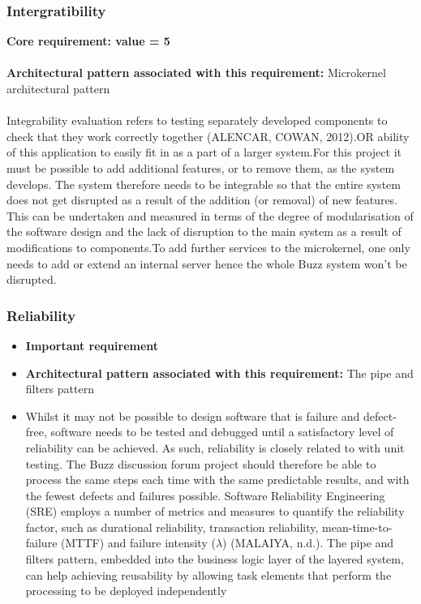 \documentclass[a4paper]{article}
\begin{document}
\subsubsection{Intergratibility}
\textbf{Core requirement: value = 5}
\\
\\\textbf{Architectural pattern associated with this requirement:} Microkernel architectural pattern
\\ 
\\Integrability evaluation refers to testing separately developed components to check that they work correctly together (ALENCAR, COWAN, 2012).OR ability of this application to easily fit in as a part of a larger system.For this project it must be possible to add additional features, or to remove them, as the system develops. The system therefore needs to be integrable so that the entire system does not get disrupted as a result of the addition (or removal) of new features. This can be undertaken and measured in terms of the degree of modularisation of the software design and the lack of disruption to the main system as a result of modifications to components.To add further services to the microkernel, one only needs to add or extend an internal server hence the whole Buzz system won't be disrupted.


\subsubsection{Reliability}
\begin{itemize}
	\item \textbf{Important requirement}
	\item \textbf{Architectural pattern associated with this requirement:} The pipe and filters pattern 
	\item Whilst it may not be possible to design software that is failure and defect-free, software needs to be tested and debugged until a satisfactory level of reliability can be achieved. As such, reliability is closely related to with unit testing. The Buzz discussion forum project should therefore be able to process the same steps each time with the same predictable results, and with the fewest defects and failures possible. Software Reliability Engineering (SRE) employs a number of metrics and measures to quantify the reliability factor, such as durational reliability, transaction reliability, mean-time-to-failure (MTTF) and failure intensity ($\lambda$) (MALAIYA, n.d.). The pipe and filters pattern, embedded into the business logic layer of the layered system, can help achieving reusability by allowing task elements that perform the processing to be deployed independently
\end{itemize}
\end{document}
